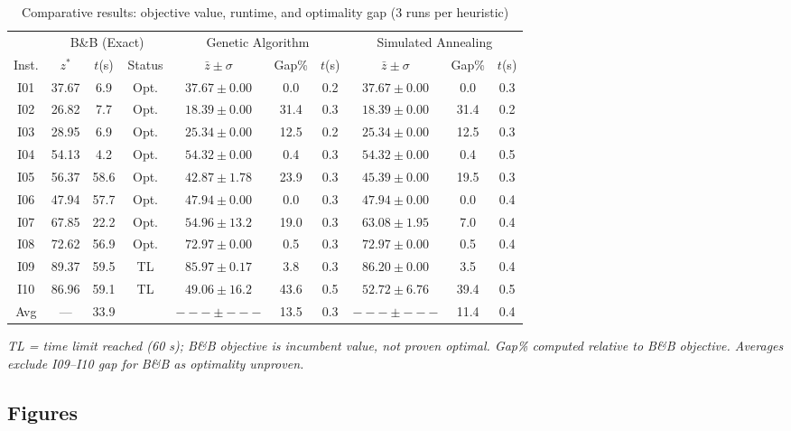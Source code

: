 \documentclass[12pt,a4paper]{article}
\begin{document}
\begin{table}[H]
\centering
\caption{Comparative results: objective value, runtime, and optimality gap (3 runs per heuristic)}
\label{tab:results}
\renewcommand{\arraystretch}{1.15}
\begin{tabular}{c|ccc|ccc|ccc}
\toprule
 & \multicolumn{3}{c|}{B\&B (Exact)} & \multicolumn{3}{c|}{Genetic Algorithm}
 & \multicolumn{3}{c}{Simulated Annealing} \\
Inst. & $z^*$ & $t$(s) & Status
      & $\bar{z}\pm\sigma$ & Gap\% & $t$(s)
      & $\bar{z}\pm\sigma$ & Gap\% & $t$(s) \\
\midrule
I01 & 37.67 &  6.9 & Opt. & $37.67\pm0.00$ &  0.0 & 0.2 & $37.67\pm0.00$ &  0.0 & 0.3 \\
I02 & 26.82 &  7.7 & Opt. & $18.39\pm0.00$ & 31.4 & 0.3 & $18.39\pm0.00$ & 31.4 & 0.2 \\
I03 & 28.95 &  6.9 & Opt. & $25.34\pm0.00$ & 12.5 & 0.2 & $25.34\pm0.00$ & 12.5 & 0.3 \\
I04 & 54.13 &  4.2 & Opt. & $54.32\pm0.00$ &  0.4 & 0.3 & $54.32\pm0.00$ &  0.4 & 0.5 \\
I05 & 56.37 & 58.6 & Opt. & $42.87\pm1.78$ & 23.9 & 0.3 & $45.39\pm0.00$ & 19.5 & 0.3 \\
I06 & 47.94 & 57.7 & Opt. & $47.94\pm0.00$ &  0.0 & 0.3 & $47.94\pm0.00$ &  0.0 & 0.4 \\
I07 & 67.85 & 22.2 & Opt. & $54.96\pm13.2$ & 19.0 & 0.3 & $63.08\pm1.95$ &  7.0 & 0.4 \\
I08 & 72.62 & 56.9 & Opt. & $72.97\pm0.00$ &  0.5 & 0.3 & $72.97\pm0.00$ &  0.5 & 0.4 \\
I09 & 89.37 & 59.5 & TL   & $85.97\pm0.17$ &  3.8 & 0.3 & $86.20\pm0.00$ &  3.5 & 0.4 \\
I10 & 86.96 & 59.1 & TL   & $49.06\pm16.2$ & 43.6 & 0.5 & $52.72\pm6.76$ & 39.4 & 0.5 \\
\midrule
Avg &  ---  & 33.9 &      & $---\pm---$    & 13.5 & 0.3 & $---\pm---$    & 11.4 & 0.4 \\
\bottomrule
\end{tabular}

\smallskip
\small\textit{TL = time limit reached (60 s); B\&B objective is incumbent value, not proven optimal.
Gap\% computed relative to B\&B objective. Averages exclude I09--I10 gap for B\&B as optimality unproven.}
\end{table}

\subsection{Figures}
\end{document}
